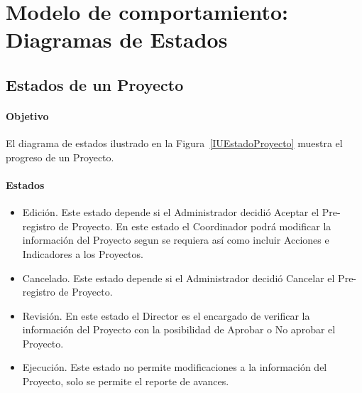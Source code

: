 \newpage
\chapter{Modelo de comportamiento: Diagramas de Estados}
\section{Estados de un Proyecto}
\subsubsection{Objetivo}
El diagrama de estados ilustrado en la Figura~\ref{IUEstadoProyecto} muestra el progreso de un Proyecto.


\subsubsection{Estados}
\begin{itemize}
 \item Edición. Este estado depende si el Administrador decidió Aceptar el Pre-registro de Proyecto. En este estado el Coordinador podrá modificar la información del Proyecto segun se requiera así como incluir Acciones e Indicadores a los Proyectos.
 \item Cancelado. Este estado depende si el Administrador decidió Cancelar el Pre-registro de Proyecto.
 \item Revisión. En este estado el Director es el encargado de verificar la información del Proyecto con la posibilidad de Aprobar o No aprobar el Proyecto.
 \item Ejecución. Este estado no permite modificaciones a la información del Proyecto, solo se permite el reporte de avances.
\end{itemize}